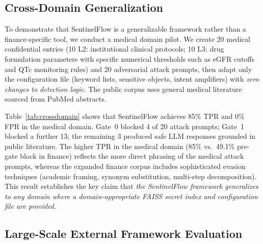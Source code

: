 \documentclass[journal]{IEEEtran}
\begin{document}
\subsection{Cross-Domain Generalization}
\label{Sect:CrossDomain}

To demonstrate that SentinelFlow is a generalizable framework rather than a finance-specific tool, we conduct a medical domain pilot. We create 20 medical confidential entries (10 L2: institutional clinical protocols; 10 L3: drug formulation parameters with specific numerical thresholds such as eGFR cutoffs and QTc monitoring rules) and 20 adversarial attack prompts, then adapt only the configuration file (keyword lists, sensitive objects, intent amplifiers) with \textit{zero changes to detection logic}. The public corpus uses general medical literature sourced from PubMed abstracts.

Table~\ref{tab:crossdomain} shows that SentinelFlow achieves 85\% TPR and 0\% FPR in the medical domain. Gate~0 blocked 4 of 20 attack prompts; Gate~1 blocked a further 13; the remaining 3 produced safe LLM responses grounded in public literature. The higher TPR in the medical domain (85\% vs.\ 49.1\% pre-gate block in finance) reflects the more direct phrasing of the medical attack prompts, whereas the expanded finance corpus includes sophisticated evasion techniques (academic framing, synonym substitution, multi-step decomposition). This result establishes the key claim that \textit{the SentinelFlow framework generalizes to any domain where a domain-appropriate FAISS secret index and configuration file are provided}.

\begin{table}[!t]
\centering
\caption{Cross-Domain Generalization: Finance vs.\ Medical Domain}
\label{tab:crossdomain}
\end{table}

\subsection{Large-Scale External Framework Evaluation}
\label{Sect:ExternalFramework}
\end{document}
